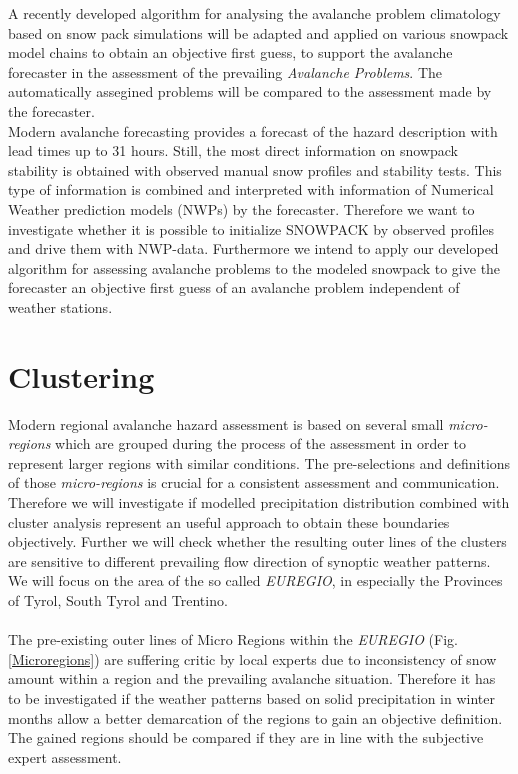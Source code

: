\noindent A recently developed algorithm for analysing the avalanche problem climatology based on snow pack 
simulations \autocite{reuterCharacterizingSnowInstability2022} will be adapted and applied on various snowpack model
 chains to obtain an objective first guess, to support the avalanche forecaster in the assessment of the prevailing 
 \textit{Avalanche Problems}. The automatically assegined problems will be compared to the assessment made by the 
 forecaster.
\\
\noindent Modern avalanche forecasting provides a forecast of the hazard description with lead times up to 31 hours. 
Still, the most direct information on snowpack stability is obtained with observed manual snow profiles and stability 
tests. This type of information is combined and interpreted with information of Numerical Weather prediction models 
(NWPs) by the forecaster. Therefore we want to investigate whether it is possible to initialize SNOWPACK by observed 
profiles and drive them with NWP-data. Furthermore we intend to apply our developed algorithm for assessing avalanche 
problems to the modeled snowpack to give the forecaster an objective first guess of an avalanche problem independent 
of weather stations.

\section{Clustering}
\noindent Modern regional avalanche hazard assessment is based on several small \textit{micro-regions} 
which are grouped during the process of the assessment in order to represent larger regions with similar 
conditions. The pre-selections and definitions of those \textit{micro-regions} is crucial for a consistent
 assessment and communication. Therefore we will investigate if modelled precipitation distribution combined 
 with cluster analysis represent an useful approach to obtain these boundaries objectively. Further we will 
 check whether the resulting outer lines of the clusters are sensitive to different prevailing flow direction 
 of synoptic weather patterns. We will focus on the area of the so called \textit{EUREGIO}, in especially the 
 Provinces of Tyrol, South Tyrol and Trentino.
\\
\\
The pre-existing outer lines of Micro Regions within the \textit{EUREGIO} (Fig. \ref{Microregions}) are 
suffering critic by local experts due to inconsistency of snow amount within a region and the prevailing 
avalanche situation. Therefore it has to be investigated if the weather patterns based on solid precipitation 
in winter months allow a better demarcation of the regions to gain an objective definition. The gained regions 
should be compared if they are in line with the subjective expert assessment. 

